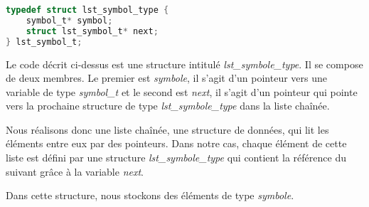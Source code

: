 \lstset{style=mystyle}
\begin{lstlisting}[language=C, caption=Structure d'une liste de symbole]
typedef struct lst_symbol_type {
    symbol_t* symbol;
    struct lst_symbol_t* next;
} lst_symbol_t;

\end{lstlisting}

Le code décrit ci-dessus est une structure intitulé \textit{lst\_symbole\_type}. Il se compose de deux membres. Le premier est \textit{symbole}, il s'agit d'un pointeur vers une variable de type \textit{symbol\_t} et le second est \textit{next}, il s'agit d'un pointeur qui pointe vers la prochaine structure de type \textit{lst\_symbole\_type} dans la liste chaînée.

Nous réalisons donc une liste chaînée, une structure de données, qui lit les éléments entre eux par des pointeurs.  Dans notre cas, chaque élément de cette liste est défini par une structure \textit{lst\_symbole\_type} qui contient la référence du suivant grâce à la variable \textit{next}.

Dans cette structure, nous stockons des éléments de type \textit{symbole}.


\newpage